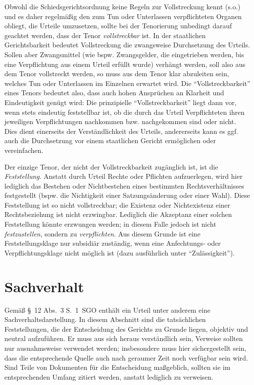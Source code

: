 Obwohl die Schiedsgerichtsordnung keine Regeln zur Vollstreckung kennt (s.o.) und es daher regelmäßig den zum Tun oder Unterlassen verpflichteten Organen obliegt, die Urteile umzusetzen, sollte bei der Tenorierung unbedingt darauf geachtet werden, dass der Tenor \emph{vollstreckbar} ist.
In der staatlichen Gerichtsbarkeit bedeutet Vollstreckung die zwangsweise Durchsetzung des Urteils.
Sollen aber Zwangsmittel (wie bspw. Zwangsgelder, die eingetrieben werden, bis eine Verpflichtung aus einem Urteil erfüllt wurde) verhängt werden, soll also aus dem Tenor vollstreckt werden, so muss aus dem Tenor klar abzuleiten sein, welches Tun oder Unterlassen im Einzelnen erwartet wird.
Die \enquote{Vollstreckbarkeit} eines Tenors bedeutet also, dass auch hohen Ansprüchen an Klarheit und Eindeutigkeit genügt wird:
Die prinzipielle \enquote{Vollstreckbarkeit} liegt dann vor, wenn stets eindeutig feststellbar ist, ob die durch das Urteil Verpflichteten ihren jeweiligen Verpflichtungen nachkommen bzw. nachgekommen sind oder nicht.
Dies dient einerseits der Verständlichkeit des Urteils, andererseits kann es ggf. auch die Durchsetzung vor einem staatlichen Gericht ermöglichen oder vereinfachen.

Der einzige Tenor, der nicht der Vollstreckbarkeit zugänglich ist, ist die \emph{Feststellung}.
Anstatt durch Urteil Rechte oder Pflichten aufzuerlegen, wird hier lediglich das Bestehen oder Nichtbestehen eines bestimmten Rechtsverhältnisses festgestellt (bspw. die Nichtigkeit einer Satzungsänderung oder einer Wahl).
Diese Feststellung ist so nicht vollstreckbar; die Existenz oder Nichtexistenz einer Rechtsbeziehung ist nicht erzwingbar.
Lediglich die Akzeptanz einer solchen Feststellung könnte erzwungen werden; in diesem Falle jedoch ist nicht \emph{festzustellen}, sondern zu \emph{verpflichten}.
Aus diesem Grunde ist eine Feststellungsklage nur subsidiär zuständig, wenn eine Anfechtungs- oder Verpflichtungsklage nicht möglich ist (dazu ausführlich unter \enquote{Zulässigkeit}).

\section{Sachverhalt}
\label{Urteilsaufbau:Sachverhalt}
Gemäß \S~12 Abs.~3 S.~1~SGO enthält ein Urteil unter anderem eine Sachverhaltsdarstellung.
In diesem Abschnitt sind die tatsächlichen Feststellungen, die der Entscheidung des Gerichts zu Grunde liegen, objektiv und neutral aufzuführen.
Er muss aus sich heraus verständlich sein, Verweise sollten nur ausnahmsweise verwendet werden; insbesondere muss hier sichergestellt sein, dass die entsprechende Quelle auch nach geraumer Zeit noch verfügbar sein wird.
Sind Teile von Dokumenten für die Entscheidung maßgeblich, sollten sie im entsprechenden Umfang zitiert werden, anstatt lediglich zu verweisen.

